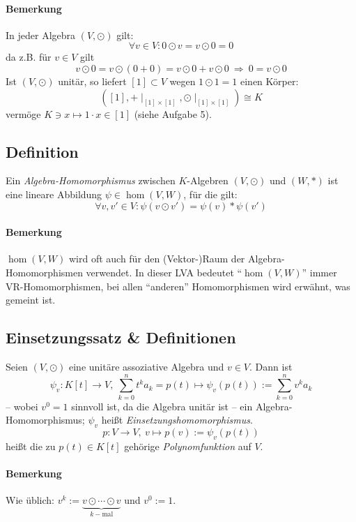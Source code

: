 \paragraph{Bemerkung}
	In jeder Algebra $ (V,\odot) $ gilt:
		\[ \forall v\in V: 0\odot v = v\odot 0 = 0 \]
	da z.B. für $ v\in V $ gilt
		\[ v\odot 0 = v\odot (0+0) = v\odot 0 + v\odot 0 \ \Rightarrow\  0=v\odot 0\]
	Ist $ (V,\odot) $ unitär, so liefert $ [1]\subset V $ wegen $ 1\odot 1 = 1 $ einen Körper:
		\[ ([1], +\mid_{[1]\times [1]},\odot\mid_{[1]\times [1]} ) \cong K \]
	vermöge $ K\ni x \mapsto 1 \cdot x\in [1] $ (siehe Aufgabe 5).
\subsection{Definition}
	\begin{Definition}
		Ein \emph{Algebra-Homomorphismus} zwischen $ K $-Algebren $ (V,\odot) $ und $ (W,*) $ ist eine lineare Abbildung $ \psi\in \hom(V,W) $, für die gilt:
		\[ \forall v,v' \in V: \psi(v\odot v')=\psi(v)*\psi(v') \]
	\end{Definition}
\paragraph{Bemerkung}
	$ \hom(V,W) $ wird oft auch für den (Vektor-)Raum der Algebra-Homomorphismen verwendet. In dieser LVA bedeutet "`$ \hom(V,W) $"' immer VR-Homomorphismen, bei allen "`anderen"' Homomorphismen wird  erwähnt, was gemeint ist.


\subsection{Einsetzungssatz \& Definitionen}
	\begin{Satz}[Einsetzungssatz]
		Seien $ (V,\odot) $ eine unitäre assoziative Algebra und $ v\in V $. Dann ist
			\[ \psi_v: K[t]\to V,\ \sum_{k=0}^{n}t^ka_k = p(t)\mapsto \psi_v(p(t)) := \sum_{k=0}^{n}v^ka_k \]
		-- wobei $ v^0 = 1 $ sinnvoll ist, da die Algebra unitär ist -- ein Algebra-Homomorphismus; $ \psi_v $ heißt \emph{Einsetzungshomomorphismus}. 
			\[ p:V\to V,\ v\mapsto p(v) := \psi_v(p(t)) \]
		heißt die zu $ p(t)\in K[t] $ gehörige \emph{Polynomfunktion} auf $ V $.
	\end{Satz}
\paragraph{Bemerkung}
	Wie üblich: $ v^k := \underset{k-\text{mal}}{\underbrace{v\odot\cdots \odot v}} $ und $ v^0 := 1 $.
